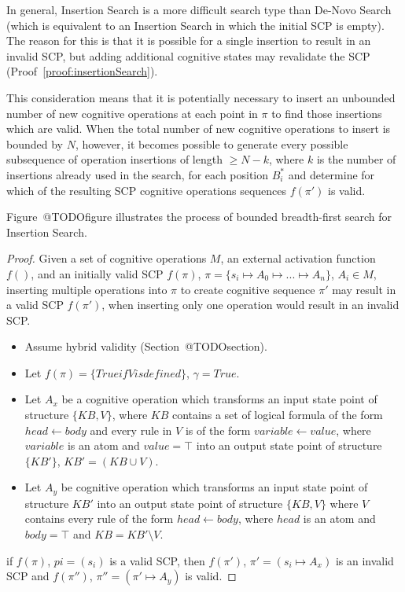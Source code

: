 In general, Insertion Search is a more difficult search type than De-Novo Search (which is equivalent to an Insertion Search in which the initial SCP is empty). The reason for this is that it is possible for a single insertion to result in an invalid SCP, but adding additional cognitive states may revalidate the SCP (Proof~\ref{proof:insertionSearch}).

This consideration means that it is potentially necessary to insert an unbounded number of new cognitive operations at each point in $\pi$ to find those insertions which are valid. When the total number of new cognitive operations to insert is bounded by $N$, however, it becomes possible to generate every possible subsequence of operation insertions of length $\geq N-k$, where $k$ is the number of insertions already used in the search, for each position $B^*_i$ and determine for which of the resulting SCP cognitive operations sequences $f(\pi')$ is valid.

Figure~@TODOfigure illustrates the process of bounded breadth-first search for Insertion Search.

\begin{proof} \label{proof:insertionSearch}
Given a set of cognitive operations $M$, an external activation function $f()$, and an initially valid SCP $f(\pi)$, $\pi=\{s_i \longmapsto A_0 \longmapsto ... \longmapsto A_n\}$, $A_i \in M$, inserting multiple operations into $\pi$ to create cognitive sequence $\pi'$ may result in a valid SCP $f(\pi')$, when inserting only one operation would result in an invalid SCP.

\begin{itemize}
\item Assume hybrid validity (Section~@TODOsection).
\item Let $f(\pi)=\{True if V is defined\}$, $\gamma = True$.
\item Let $A_x$ be a cognitive operation which transforms an input state point of structure $\{KB, V\}$, where $KB$ contains a set of logical formula of the form $head \leftarrow body$ and every rule in $V$ is of the form $variable \leftarrow value$, where $variable$ is an atom and  $value=\top$ into an output state point of structure $\{KB'\}$, $KB'=(KB \cup V)$.
\item Let $A_y$ be cognitive operation which transforms an input state point of structure $KB'$ into an output state point of structure $\{KB, V\}$ where $V$ contains every rule of the form $head \leftarrow body$, where $head$ is an atom and $body=\top$ and $KB= KB' \setminus V$.
\end{itemize}
\item if $f(\pi)$, $pi=(s_i)$ is a valid SCP, then $f(\pi')$, $\pi'=(s_i\longmapsto A_x)$ is an invalid SCP and $f(\pi'')$, $\pi''=(\pi'\longmapsto A_y)$ is valid.
\end{proof}












